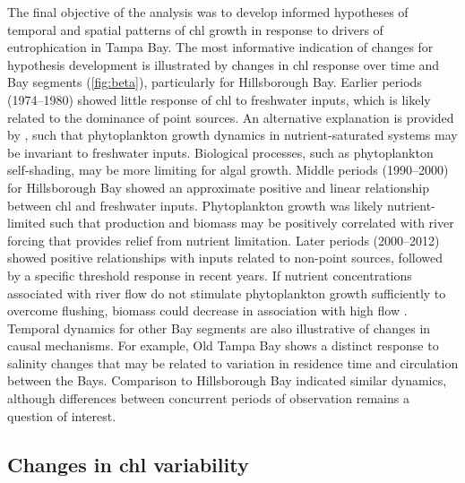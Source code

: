 \documentclass[letterpaper,12pt,oneside]{article}\usepackage{graphicx, color}
\begin{document}
The final objective of the analysis was to develop informed hypotheses of temporal and spatial patterns of \ac{chl} growth in response to drivers of eutrophication in Tampa Bay.  The most informative indication of changes for hypothesis development is illustrated by changes in \ac{chl} response over time and Bay segments (\cref{fig:beta}), particularly for Hillsborough Bay.  Earlier periods (1974--1980) showed little response of \ac{chl} to freshwater inputs, which is likely related to the dominance of point sources.  An alternative explanation is provided by \citet{Wofsy83}, such that phytoplankton growth dynamics in nutrient-saturated systems may be invariant to freshwater inputs.  Biological processes, such as phytoplankton self-shading, may be more limiting for algal growth.  Middle periods (1990--2000) for Hillsborough Bay showed an approximate positive and linear relationship between \ac{chl} and freshwater inputs.  Phytoplankton growth was likely nutrient-limited such that production and biomass may be positively correlated with river forcing that provides relief from nutrient limitation.  Later periods (2000--2012) showed positive relationships with inputs related to non-point sources, followed by a specific threshold response in recent years.  If nutrient concentrations associated with river flow do not stimulate phytoplankton growth sufficiently to overcome flushing, biomass could decrease in association with high flow \citep{Murrell07}.  Temporal dynamics for other Bay segments are also illustrative of changes in causal mechanisms.  For example, Old Tampa Bay shows a distinct response to salinity changes that may be related to variation in residence time and circulation between the Bays.  Comparison to Hillsborough Bay indicated similar dynamics, although differences between concurrent periods of observation remains a question of interest.

\subsection{Changes in \ac{chl} variability}
\end{document}
